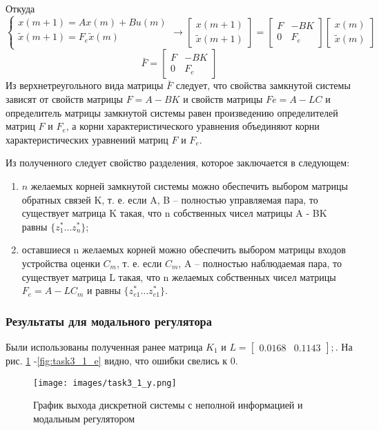 \documentclass[a4paper, 14pt]{extarticle}
\theoremstyle{definition}
\theoremstyle{plain}
\theoremstyle{remark}
\begin{document}
Откуда
\[
\begin{cases}
	x(m+1) = A x(m) + B u(m) \\
	\tilde x(m+1) = F_e  \tilde x(m) \\
\end{cases} \rightarrow
\begin{bmatrix}
x(m+1) \\
\tilde x(m+1)
\end{bmatrix}
=
\begin{bmatrix}
	F & -BK \\
	0 & F_e
\end{bmatrix}
\begin{bmatrix}
	x(m) \\
	\tilde x(m)
\end{bmatrix}
\]
\[\bar F = \begin{bmatrix}
	F & -BK \\
	0 & F_e
\end{bmatrix}\]
Из верхнетреугольного вида матрицы \(\bar F\) следует, что свойства замкнутой
системы зависят от свойств матрицы \(F = A - BK\) и свойств матрицы \(Fe = A - LC\) и определитель матрицы замкнутой системы равен произведению определителей матриц \(F\) и \(F_e\), а корни характеристического уравнения объединяют корни характеристических уравнений матриц \(F\) и \(F_e\).

Из полученного следует свойство разделения, которое заключается в следующем:
\begin{enumerate}
	\item \(n\) желаемых корней замкнутой системы можно обеспечить выбором матрицы обратных связей K, т. е. если A, B -- полностью управляемая пара, то существует матрица K такая, что n собственных чисел матрицы A - BK равны \(\{z_1^* \dots z_n^*\}\);
	\item оставшиеся n желаемых корней можно обеспечить выбором матрицы входов устройства оценки \(C_m\), т. е. если \(C_m\), A -- полностью наблюдаемая пара, то существует матрица L такая, что n желаемых собственных чисел матрицы \(F_e =A-LC_m\) и равны \(\{z_{e1}^* \dots z_{e1}^*\}\).
\end{enumerate}

\subsubsection{Результаты для модального регулятора}
Были использованы полученная ранее матрица \(K_1\) и
\(
L = \begin{bmatrix}
	0.0168 & 0.1143
\end{bmatrix};
\). На рис. \ref{fig:task3_1_y} -\ref{fig:task3_1_e} видно, что ошибки свелись к 0.
\begin{figure}
	[H]
	\centering
	\texttt{[image: images/task3\_1\_y.png]}
	\caption{График выхода дискретной системы с неполной информацией и модальным регулятором}
	\label{fig:task3_1_y}
\end{figure}
\end{document}
